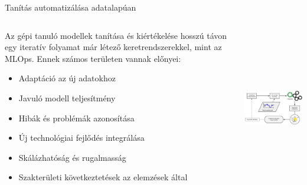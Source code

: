 \documentclass[english, aspectratio=169]{beamer}
\begin{document}
\begin{frame}{Tanítás automatizálása adatalapúan}
\begin{columns}
\begin{column}{.5\textwidth}
Az gépi tanuló modellek tanítása és kiértékelése hosszú távon egy iteratív folyamat már létező keretrendszerekkel, mint az MLOps. Ennek számos területen vannak előnyei:
\begin{itemize}
	\item Adaptáció az új adatokhoz
	\item Javuló modell teljesítmény
	\item Hibák és problémák azonosítása
	\item Új technológiai fejlődés integrálása
	\item Skálázhatóság és rugalmasság
	\item Szakterületi következtetések az elemzések által
\end{itemize}
\end{column}
\begin{column}{.5\textwidth}
\begin{center}
\includegraphics[width=7cm, height=7cm, keepaspectratio]{images/osztalyozas_3.png}
\end{center}
\end{column}
\end{columns}
\end{frame}
\end{document}
